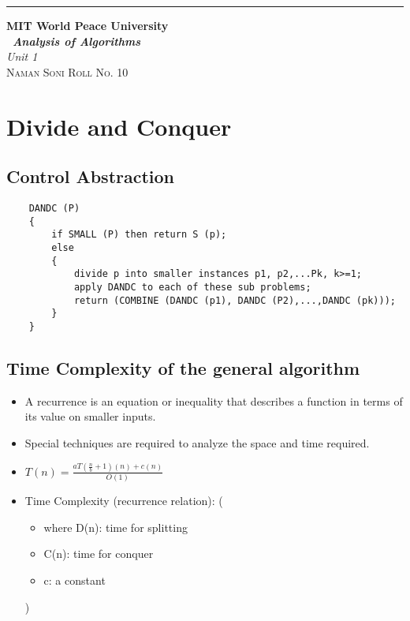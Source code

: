 \documentclass{article}
\begin{document}
\lstset{style=mystyle}
\begin{titlepage} %

	\raggedleft\rule{1pt}{\textheight} %
	\hspace{0.05\textwidth} %
	\parbox[b]{0.75\textwidth}
    { %
		
		{\Huge\bfseries MIT World Peace University \\[0.5\baselineskip] \ \textit{Analysis of Algorithms}}\\[2\baselineskip] %
		{\large\textit{Unit 1}}\\[4\baselineskip] %
		{\Large\textsc{Naman Soni Roll No. 10}} %
		
		\vspace{0.5\textheight} %
	}

\end{titlepage}
\tableofcontents
\pagebreak
\section{Divide and Conquer}
\subsection{Control Abstraction}
\begin{lstlisting}
    DANDC (P)
    {
        if SMALL (P) then return S (p);
        else
        {
            divide p into smaller instances p1, p2,...Pk, k>=1;
            apply DANDC to each of these sub problems;
            return (COMBINE (DANDC (p1), DANDC (P2),...,DANDC (pk)));
        }
    }
\end{lstlisting}
\subsection{Time Complexity of the general algorithm}
\begin{itemize}
    \item A recurrence is an equation or inequality that describes a function in terms of its value on smaller inputs.
    \item Special techniques are required to analyze the space and time required.
    \item $T(n) = {\frac{aT(\frac{n}{b}+1)(n)+c(n)}{O(1)}}$
    \item Time Complexity (recurrence relation):
    (\begin{itemize}
        \item where D(n): time for splitting 
        \item C(n): time for conquer
        \item c: a constant
    \end{itemize})
\end{itemize}
\end{document}
